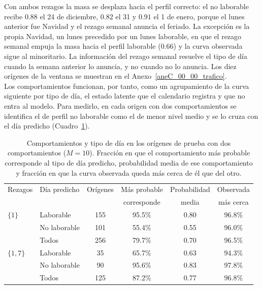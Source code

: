Con ambos rezagos la masa se desplaza hacia el perfil correcto: el no laborable recibe $0.88$ el 24 de diciembre, $0.82$ el 31 y $0.91$ el 1 de enero, porque el lunes anterior fue Navidad y el rezago semanal anuncia el feriado. La excepción es la propia Navidad, un lunes precedido por un lunes laborable, en que el rezago semanal empuja la masa hacia el perfil laborable ($0.66$) y la curva observada sigue al minoritario. La información del rezago semanal resuelve el tipo de día cuando la semana anterior lo anuncia, y no cuando no lo anuncia. Los diez orígenes de la ventana se muestran en el Anexo~\ref{aneC_00_00_trafico}.\\

Los comportamientos funcionan, por tanto, como un agrupamiento de la curva siguiente por tipo de día, el estado latente que el calendario registra y que no entra al modelo. Para medirlo, en cada origen con dos comportamientos se identifica el de perfil no laborable como el de menor nivel medio y se lo cruza con el día predicho (Cuadro~\ref{tab:apl_K_tipo}).

\begin{table}[H]
\centering\small
\setlength{\tabcolsep}{4pt}
\caption{Comportamientos y tipo de día en los orígenes de prueba con dos comportamientos ($M = 10$). Fracción en que el comportamiento más probable corresponde al tipo de día predicho, probabilidad media de ese comportamiento y fracción en que la curva observada queda más cerca de él que del otro.}
\label{tab:apl_K_tipo}
\begin{tabular}{l l c ccc}
\hline
Rezagos & Día predicho & Orígenes & Más probable & Probabilidad & Observada \\
 & & & corresponde & media & más cerca \\
\hline
$\{1\}$   & Laborable    & 155 & 95.5\% & 0.80 & 96.8\% \\
          & No laborable & 101 & 55.4\% & 0.55 & 96.0\% \\
          & Todos        & 256 & 79.7\% & 0.70 & 96.5\% \\
\hline
$\{1,7\}$ & Laborable    & 35  & 65.7\% & 0.63 & 94.3\% \\
          & No laborable & 90  & 95.6\% & 0.83 & 97.8\% \\
          & Todos        & 125 & 87.2\% & 0.77 & 96.8\% \\
\hline
\end{tabular}
\end{table}

